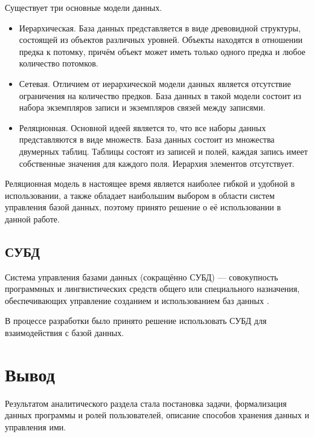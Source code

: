 Существует три основные модели данных.
\begin{itemize}
	\item Иерархическая. База данных представляется в виде древовидной структуры, состоящей из объектов различных уровней. Объекты находятся в отношении предка к потомку, причём объект может иметь только одного предка и любое количество потомков.
	\item Сетевая. Отличием от иерархической модели данных является отсутствие ограничения на количество предков. База данных в такой модели состоит из набора экземпляров записи и экземпляров связей между записями.
	\item Реляционная. Основной идеей является то, что все наборы данных представляются в виде множеств. База данных состоит из множества двумерных таблиц. Таблицы состоят из записей и полей, каждая запись имеет собственные значения для каждого поля. Иерархия элементов отсутствует. 
\end{itemize}

Реляционная модель в настоящее время является наиболее гибкой и удобной в использовании, а также обладает наибольшим выбором в области систем управления базой данных, поэтому принято решение о её использовании в данной работе.


\subsection{СУБД}
Система управления базами данных (сокращённо СУБД) — совокупность
программных и лингвистических средств общего или специального назначения,
обеспечивающих управление созданием и использованием баз данных \cite{db_model}.

В процессе разработки было принято решение использовать СУБД для взаимодействия с базой данных.


\section*{Вывод}
Результатом аналитического раздела стала постановка задачи, формализация данных программы и ролей пользователей, описание способов хранения данных и управления ими.
